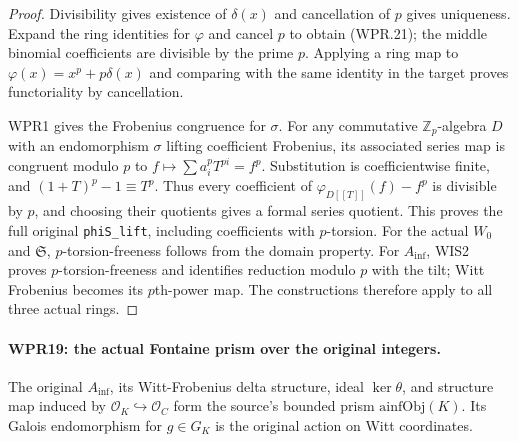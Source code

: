\documentclass[11pt,a4paper]{article}
\numberwithin{equation}{section}
\theoremstyle{remark}\newtheorem{remark}[theorem]{Remark}
\begin{document}
\begin{proof}
Divisibility gives existence of $\delta(x)$ and cancellation of
$p$ gives uniqueness. Expand the ring identities for $\varphi$
and cancel $p$ to obtain (WPR.21); the middle binomial
coefficients are divisible by the prime $p$. Applying a ring
map to $\varphi(x)=x^p+p\delta(x)$ and comparing with the
same identity in the target proves functoriality by cancellation.

WPR1 gives the Frobenius congruence for $\sigma$. For any
commutative $\mathbb Z_p$-algebra $D$ with an endomorphism
$\sigma$ lifting coefficient Frobenius, its associated series
map is congruent modulo $p$ to
$f\mapsto\sum a_i^pT^{pi}=f^p$. Substitution is coefficientwise
finite, and $(1+T)^p-1\equiv T^p$. Thus every coefficient of
$\varphi_{D[[T]]}(f)-f^p$ is divisible by $p$, and choosing
their quotients gives a formal series quotient. This proves the
full original \texttt{phi\allowbreak S\_\allowbreak lift}, including coefficients with
$p$-torsion. For the actual $W_0$ and $\mathfrak S$,
$p$-torsion-freeness follows from the domain property.
For $A_{\mathrm{inf}}$, WIS2 proves $p$-torsion-freeness and identifies
reduction modulo $p$ with the tilt; Witt Frobenius becomes its
$p$th-power map. The constructions therefore apply to all three
actual rings.
\end{proof}

\paragraph{WPR19: the actual Fontaine prism over the original integers.}
\label{claim:WPR19}
The original $A_{\mathrm{inf}}$, its Witt-Frobenius delta structure,
ideal $\ker\theta$, and structure map induced by
$\mathcal O_K\hookrightarrow\mathcal O_C$ form the source's
bounded prism $\mathrm{ainfObj}(K)$. Its Galois endomorphism
for $g\in G_K$ is the original action on Witt coordinates.
\end{document}

